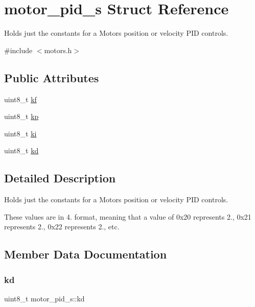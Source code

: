 \hypertarget{structmotor__pid__s}{}\section{motor\+\_\+pid\+\_\+s Struct Reference}
\label{structmotor__pid__s}


Holds just the constants for a Motor\textquotesingle{}s position or velocity P\+ID controls.  




{\ttfamily \#include $<$motors.\+h$>$}

\subsection*{Public Attributes}
\begin{DoxyCompactItemize}
\item 
uint8\+\_\+t \mbox{\hyperlink{structmotor__pid__s_aad53ebe7d1c645811b3dc6cb825bd590}{kf}}
\item 
uint8\+\_\+t \mbox{\hyperlink{structmotor__pid__s_a31c38ff6a4245e81c4db42579b90be31}{kp}}
\item 
uint8\+\_\+t \mbox{\hyperlink{structmotor__pid__s_ac894dd6c3683c2daa403b81e259a1cae}{ki}}
\item 
uint8\+\_\+t \mbox{\hyperlink{structmotor__pid__s_a5241cf4e6e0b3aed6cf9fc52d83769ab}{kd}}
\end{DoxyCompactItemize}


\subsection{Detailed Description}
Holds just the constants for a Motor\textquotesingle{}s position or velocity P\+ID controls. 

These values are in 4. format, meaning that a value of 0x20 represents 2., 0x21 represents 2., 0x22 represents 2., etc. 

\subsection{Member Data Documentation}
\mbox{\label{structmotor__pid__s_a5241cf4e6e0b3aed6cf9fc52d83769ab}} 
\subsubsection{\texorpdfstring{kd}{kd}}
{\footnotesize\ttfamily uint8\+\_\+t motor\+\_\+pid\+\_\+s\+::kd}

